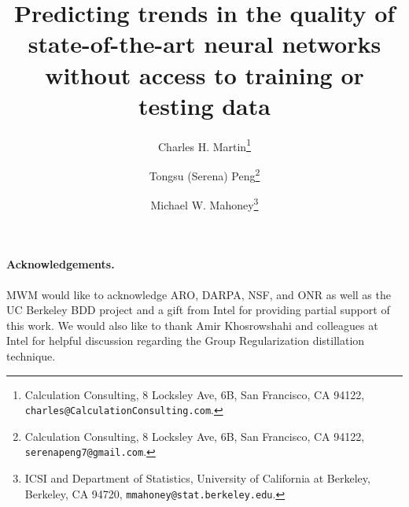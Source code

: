 \documentclass[11pt]{article}
\begin{document}
\title{%
Predicting trends in the quality of state-of-the-art neural networks without access to training or testing data
}

\author{%
Charles H. Martin\thanks{Calculation Consulting, 8 Locksley Ave, 6B, San Francisco, CA 94122, \texttt{charles@CalculationConsulting.com}.} 
\and 
Tongsu (Serena) Peng\thanks{Calculation Consulting, 8 Locksley Ave, 6B, San Francisco, CA 94122, \texttt{serenapeng7@gmail.com}.}
\and
Michael W. Mahoney\thanks{ICSI and Department of Statistics, University of California at Berkeley, Berkeley, CA 94720, \texttt{mmahoney@stat.berkeley.edu}.}
}

\date{}
\maketitle



\begin{abstract}

\end{abstract}










\vspace{-2mm}
\noindent
\paragraph{Acknowledgements.}
MWM would like to acknowledge ARO, DARPA, NSF, and ONR as well as the UC Berkeley BDD project and a gift from Intel for providing partial support of this work.
We would also like to thank Amir Khosrowshahi and colleagues at Intel for helpful discussion regarding the Group Regularization distillation technique.

\end{document}
